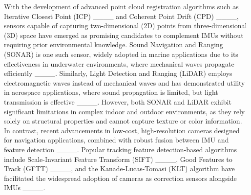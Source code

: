 With the development of advanced point cloud registration algorithms
such as Iterative Closest Point (ICP) ____ and Coherent
Point Drift (CPD) ____, sensors capable of
capturing two-dimensional (2D) points from three-dimensional (3D)
space have emerged as promising candidates to complement IMUs without
requiring prior environmental knowledge. Sound Navigation and Ranging
(SONAR) is one such sensor, widely adopted in marine applications
due to its effectiveness in underwater environments, where mechanical
waves propagate efficiently ____. Similarly,
Light Detection and Ranging (LiDAR) employs electromagnetic waves
instead of mechanical waves and has demonstrated utility in aerospace
applications, where sound propagation is limited, but light transmission
is effective ____. However, both SONAR and
LiDAR exhibit significant limitations in complex indoor and outdoor
environments, as they rely solely on structural properties and cannot
capture texture or color information. In contrast, recent advancements
in low-cost, high-resolution cameras designed for navigation applications,
combined with robust fusion between IMU and feature detection ____.
Popular tracking feature detection-based algorithms include Scale-Invariant
Feature Transform (SIFT) ____, Good Features
to Track (GFTT) ____, and the Kanade-Lucas-Tomasi (KLT)
algorithm have facilitated the widespread adoption of cameras as correction
sensors alongside IMUs ____.